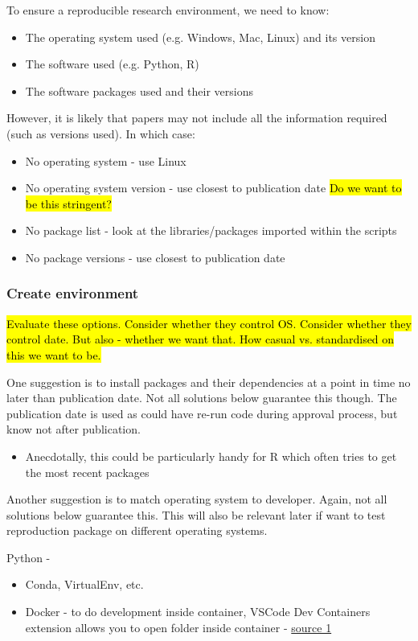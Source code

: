 To ensure a reproducible research environment, we need to know:
\begin{itemize}
    \item The operating system used (e.g. Windows, Mac, Linux) and its version 
    \item The software used (e.g. Python, R)
    \item The software packages used and their versions\autocite{the_turing_way_community_turing_2022}
\end{itemize}

However, it is likely that papers may not include all the information required (such as versions used). In which case:
\begin{itemize}
    \item No operating system - use Linux
    \item No operating system version - use closest to publication date \hl{Do we want to be this stringent?}
    \item No package list - look at the libraries/packages imported within the scripts
    \item No package versions - use closest to publication date
\end{itemize}

\subsubsection{Create environment}
\timeyes

\hl{Evaluate these options. Consider whether they control OS. Consider whether they control date. But also - whether we want that. How casual vs. standardised on this we want to be.}

One suggestion is to install packages and their dependencies at a point in time no later than publication date. Not all solutions below guarantee this though. The publication date is used as could have re-run code during approval process, but know not after publication.
\begin{itemize}
    \item Anecdotally, this could be particularly handy for R which often tries to get the most recent packages
\end{itemize}

Another suggestion is to match operating system to developer. Again, not all solutions below guarantee this. This will also be relevant later if want to test reproduction package on different operating systems.

Python -
\begin{itemize}
    \item Conda, VirtualEnv, etc.
    \item Docker - to do development inside container, VSCode Dev Containers extension allows you to open folder inside container - \href{https://code.visualstudio.com/docs/devcontainers/containers}{source 1}
\end{itemize}

